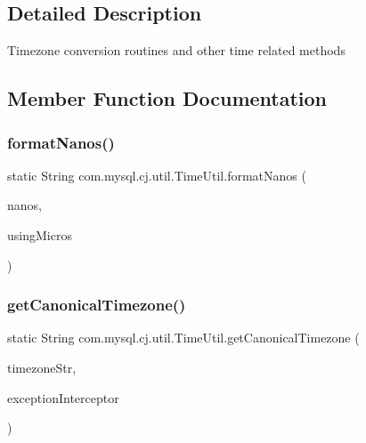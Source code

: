\subsection{Detailed Description}
Timezone conversion routines and other time related methods 

\subsection{Member Function Documentation}
\mbox{\label{classcom_1_1mysql_1_1cj_1_1util_1_1_time_util_a1dec8e63da6144ebf8d74f535566c4be}} 
\subsubsection{\texorpdfstring{format\+Nanos()}{formatNanos()}}
{\footnotesize\ttfamily static String com.\+mysql.\+cj.\+util.\+Time\+Util.\+format\+Nanos (\begin{DoxyParamCaption}\item[{int}]{nanos,  }\item[{boolean}]{using\+Micros }\end{DoxyParamCaption})\hspace{0.3cm}{\ttfamily [static]}}

\mbox{\label{classcom_1_1mysql_1_1cj_1_1util_1_1_time_util_a1b38bb130406d82a66ace616a2966b74}} 
\subsubsection{\texorpdfstring{get\+Canonical\+Timezone()}{getCanonicalTimezone()}}
{\footnotesize\ttfamily static String com.\+mysql.\+cj.\+util.\+Time\+Util.\+get\+Canonical\+Timezone (\begin{DoxyParamCaption}\item[{String}]{timezone\+Str,  }\item[{\mbox{\hyperlink{interfacecom_1_1mysql_1_1cj_1_1exceptions_1_1_exception_interceptor}{Exception\+Interceptor}}}]{exception\+Interceptor }\end{DoxyParamCaption})\hspace{0.3cm}{\ttfamily [static]}}


